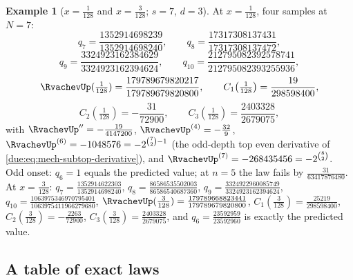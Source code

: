 \documentclass[11pt,oneside]{article}
\theoremstyle{plain}
\theoremstyle{definition}
\newtheorem{example}[theorem]{Example}
\theoremstyle{remark}
\newcommand{\upn}[1]{\RvachevUp_{#1}}
\newcommand{\Cr}[2]{C_{#1}\!\left(#2\right)}                %
\newcommand{\qn}[1]{q_{#1}}                                 %
\begin{document}
\begin{example}[$x=\tfrac1{128}$ and $x=\tfrac3{128}$; $s=7$, $d=3$]
\label{due:ex:exr-one-twenty-eighth}
At $x=\tfrac1{128}$, four samples at $N=7$:
\[
 \qn{7}=\frac{1352914698239}{1352914698240},\qquad
 \qn{8}=\frac{17317308137431}{17317308137472},
\]
\[
 \qn{9}=\frac{3324923162384629}{3324923162394624},\qquad
 \qn{10}=\frac{212795082392578741}{212795082393255936},
\]
\[
 \RvachevUp(\tfrac1{128})=\frac{179789679820217}{179789679820800},\qquad
 \Cr{1}{\tfrac1{128}}=\frac{19}{298598400},
\]
\[
 \Cr{2}{\tfrac1{128}}=-\frac{31}{72900},\qquad
 \Cr{3}{\tfrac1{128}}=\frac{2403328}{2679075},
\]
with $\RvachevUp''=-\tfrac{19}{4147200}$, $\RvachevUp^{(4)}=-\tfrac{32}9$,
$\RvachevUp^{(6)}=-1048576=-2^{\binom72-1}$ (the odd-depth top even
derivative of \cref{due:eq:mech-subtop-derivative}), and
$\RvachevUp^{(7)}=-268435456=-2^{\binom82}$.  Odd onset: $\qn{6}=1$ equals
the predicted value; at $n=5$ the law fails by $\tfrac{31}{63417876480}$.
At $x=\tfrac3{128}$: $\qn{7}=\tfrac{1352914622303}{1352914698240}$,
$\qn{8}=\tfrac{86586535502003}{86586540687360}$,
$\qn{9}=\tfrac{3324922960085749}{3324923162394624}$,
$\qn{10}=\tfrac{1063975346970795401}{1063975411966279680}$,
$\RvachevUp(\tfrac3{128})=\tfrac{179789668823441}{179789679820800}$,
$\Cr{1}{\tfrac3{128}}=\tfrac{25219}{298598400}$,
$\Cr{2}{\tfrac3{128}}=-\tfrac{2263}{72900}$,
$\Cr{3}{\tfrac3{128}}=\tfrac{2403328}{2679075}$, and $\qn{6}=\tfrac{23592959}{23592960}$
is exactly the predicted value.
\end{example}

\subsection{A table of exact laws}
\label{due:sec:exr-table}
\end{document}
